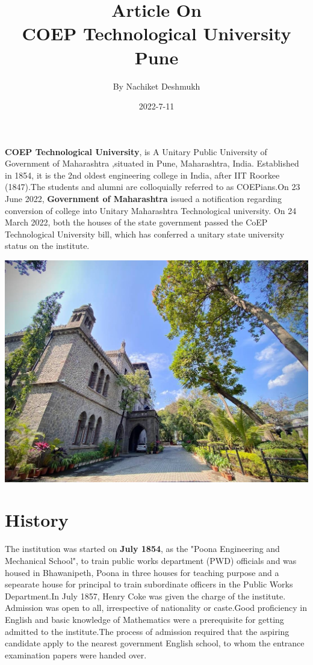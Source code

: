 \documentclass{article}
\title{\huge\textbf{Article On\\COEP Technological University Pune}}
\date{\huge 2022-7-11}
\author{\huge By Nachiket Deshmukh}
\begin{document}
\maketitle
{}
\newpage
{}

\tableofcontents
\newpage


\textbf{COEP Technological University}, is A Unitary Public University of Government of Maharashtra ,situated in Pune, Maharashtra, India. Established in 1854, it is the 2nd oldest engineering college in India, after IIT Roorkee (1847).The students and alumni are colloquially referred to as COEPians.On 23 June 2022, \textbf{Government of Maharashtra} issued a notification regarding conversion of college into Unitary Maharashtra Technological university. On 24 March 2022, both the houses of the state government passed the CoEP Technological University bill, which has conferred a unitary state university status on the institute.

\begin{center}
  \includegraphics[width=0.7\linewidth]{coep.jpg}
  \label{fig:1} 
\end{center}
\section{History}
The institution was started on \textbf{July 1854}, as the "Poona Engineering and Mechanical School", to train public works department (PWD) officials and was housed in Bhawanipeth, Poona in three houses for teaching purpose and a sepearate house for principal to train subordinate officers in the Public Works Department.In July 1857, Henry Coke was given the charge of the institute. Admission was open to all, irrespective of nationality or caste.Good proficiency in English and basic knowledge of Mathematics were a prerequisite for getting admitted to the institute.The process of admission required that the aspiring candidate apply to the nearest government English school, to whom the entrance examination papers were handed over.
\end{document}
